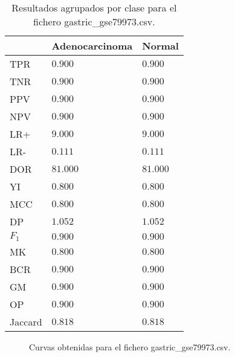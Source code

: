 \begin{table}[htp]
    \small
    \centering
    \begin{tabularx}{\columnwidth}{l Y Y}
                &  Adenocarcinoma       & Normal        \\\hline
        TPR     &  $0.900$              & $0.900$       \\\hline
        TNR     &  $0.900$              & $0.900$       \\\hline
        PPV     &  $0.900$              & $0.900$       \\\hline
        NPV     &  $0.900$              & $0.900$       \\\hline
        LR+     &  $9.000$              & $9.000$       \\\hline
        LR-     &  $0.111$              & $0.111$       \\\hline
        DOR     &  $81.000$             & $81.000$      \\\hline
        YI      &  $0.800$              & $0.800$       \\\hline
        MCC     &  $0.800$              & $0.800$       \\\hline
        DP      &  $1.052$              & $1.052$       \\\hline
        $F_{1}$ &  $0.900$              & $0.900$       \\\hline
        MK      &  $0.800$              & $0.800$       \\\hline
        BCR     &  $0.900$              & $0.900$       \\\hline
        GM      &  $0.900$              & $0.900$       \\\hline
        OP      &  $0.900$              & $0.900$       \\\hline
        Jaccard &  $0.818$              & $0.818$       \\\hline
    \end{tabularx}
    \caption{Resultados agrupados por clase para el fichero gastric\_gse79973.csv.}
    \label{tab:19}
\end{table}

\bigbreak

\begin{figure}[htp]
    \centering
    \caption{Curvas obtenidas para el fichero gastric\_gse79973.csv.}
    \label{fig:14}
\end{figure}

